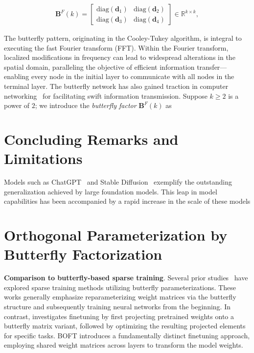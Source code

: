 \begin{equation}\label{eq:but_factor}
\begin{aligned}
    \bm{B}^F(k)=\begin{bmatrix}
    \text{diag}(\bm{d}_1) & \text{diag}(\bm{d}_2) \\
    \text{diag}(\bm{d}_3) & \text{diag}(\bm{d}_4)
    \end{bmatrix}\in\mathbb{R}^{k\times k},
\end{aligned}
\end{equation}

The butterfly pattern, originating in the Cooley-Tukey algorithm, is integral to executing the fast Fourier transform (FFT). Within the Fourier transform, localized modifications in frequency can lead to widespread alterations in the spatial domain, paralleling the objective of efficient information transfer—enabling every node in the initial layer to communicate with all nodes in the terminal layer. The butterfly network has also gained traction in computer networking~\cite{solihin2015fundamentals,li2011linear} for facilitating swift information transmission. Suppose $k \geq 2$ is a power of $2$; we introduce the \emph{butterfly factor} $\bm{B}^F(k)$ as

\section{Concluding Remarks and Limitations}

Models such as ChatGPT~\cite{brown2020language,chen2021evaluating} and Stable Diffusion~\cite{rombach2022high} exemplify the outstanding generalization achieved by large foundation models. This leap in model capabilities has been accompanied by a rapid increase in the scale of these models

\section{Orthogonal Parameterization by Butterfly Factorization}

\textbf{Comparison to butterfly-based sparse training}. Several prior studies~\cite{dao2019learning,dao2019kaleidoscope,chen2022pixelated,dao2022monarch} have explored sparse training methods utilizing butterfly parameterizations. These works generally emphasize reparameterizing weight matrices via the butterfly structure and subsequently training neural networks from the beginning. In contrast, \cite{dao2022monarch} investigates finetuning by first projecting pretrained weights onto a butterfly matrix variant, followed by optimizing the resulting projected elements for specific tasks. BOFT introduces a fundamentally distinct finetuning approach, employing shared weight matrices across layers to transform the model weights.

